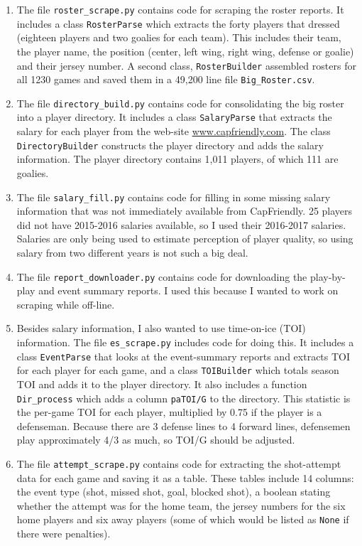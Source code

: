 \documentclass[11pt]{article}
\begin{document}
\begin{enumerate}
\def\labelenumi{\arabic{enumi}.}
\item
  The file \texttt{roster\_scrape.py} contains code for scraping the
  roster reports. It includes a class \texttt{RosterParse} which
  extracts the forty players that dressed (eighteen players and two
  goalies for each team). This includes their team, the player name, the
  position (center, left wing, right wing, defense or goalie) and their
  jersey number. A second class, \texttt{RosterBuilder} assembled
  rosters for all 1230 games and saved them in a 49,200 line file
  \texttt{Big\_Roster.csv}.
\item
  The file \texttt{directory\_build.py} contains code for consolidating
  the big roster into a player directory. It includes a class
  \texttt{SalaryParse} that extracts the salary for each player from the
  web-site \url{www.capfriendly.com}. The class \texttt{DirectoryBuilder}
  constructs the player directory and adds the salary information. The
  player directory contains 1,011 players, of which 111 are goalies.
\item
  The file \texttt{salary\_fill.py} contains code for filling in some
  missing salary information that was not immediately available from
  CapFriendly. 25 players did not have 2015-2016 salaries available, so
  I used their 2016-2017 salaries. Salaries are only being used to
  estimate perception of player quality, so using salary from two
  different years is not such a big deal.
\item
  The file \texttt{report\_downloader.py} contains code for downloading
  the play-by-play and event summary reports. I used this because I
  wanted to work on scraping while off-line.
\item
  Besides salary information, I also wanted to use time-on-ice (TOI)
  information. The file \texttt{es\_scrape.py} includes code for doing
  this. It includes a class \texttt{EventParse} that looks at the
  event-summary reports and extracts TOI for each player for each game,
  and a class \texttt{TOIBuilder} which totals season TOI and adds it to
  the player directory. It also includes a function
  \texttt{Dir\_process} which adds a column \texttt{paTOI/G} to the
  directory. This statistic is the per-game TOI for each player,
  multiplied by 0.75 if the player is a defenseman. Because there are 3
  defense lines to 4 forward lines, defensemen play approximately 4/3 as
  much, so TOI/G should be adjusted.
\item
  The file \texttt{attempt\_scrape.py} contains code for extracting the
  shot-attempt data for each game and saving it as a table. These tables
  include 14 columns: the event type (shot, missed shot, goal, blocked shot),
  a boolean stating whether the attempt was for the home team, the
  jersey numbers for the six home players and six away players (some of
  which would be listed as \texttt{None} if there were penalties).
\end{enumerate}
\end{document}
